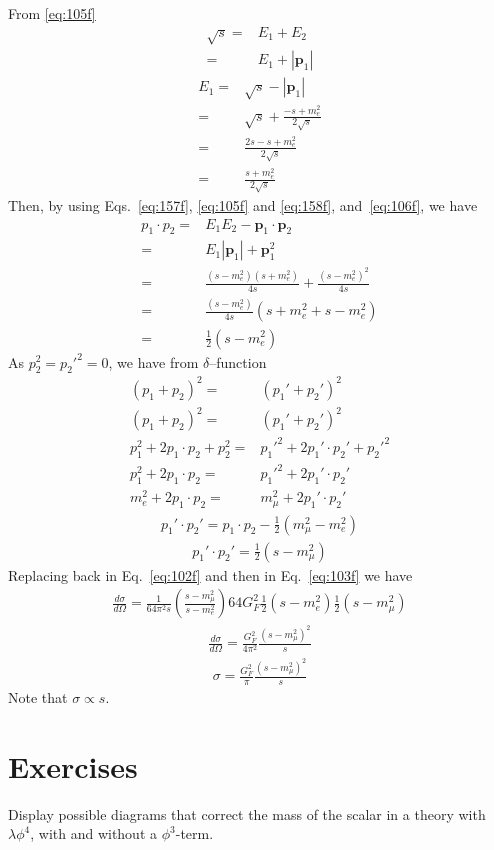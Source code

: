 From \eqref{eq:105f}
\begin{align}
  \sqrt{s}=&E_1+E_2\nonumber\\
  =&E_1+|\mathbf{p}_1|
\end{align}
\begin{align}
  \label{eq:106f}
  E_1=&\sqrt{s}-|\mathbf{p}_1|\nonumber\\
  =&\sqrt{s}+\frac{-s+m_e^2}{2\sqrt{s}}\nonumber\\
  =&\frac{2s-s+m_e^2}{2\sqrt{s}}\nonumber\\
  =&\frac{s+m_e^2}{2\sqrt{s}}
\end{align}
Then, by using Eqs.~\eqref{eq:157f}, \eqref{eq:105f} and \eqref{eq:158f}, and~\eqref{eq:106f},  we have
\begin{align}
  p_1\cdot p_2=&E_1E_2-\mathbf{p}_1\cdot\mathbf{p}_2\nonumber\\
  =&E_1|\mathbf{p}_1|+\mathbf{p}_1^2\nonumber\\
=&\frac{(s-m_e^2)(s+m_e^2)}{4s}+\frac{(s-m_e^2)^2}{4s}\nonumber\\
=&\frac{(s-m_e^2)}{4s}(s+m_e^2+s-m_e^2)\nonumber\\
=&\frac{1}{2}(s-m_e^2) 
\end{align}
As $p_2^2={p_2'}^2=0$, we have from $\delta$--function
\begin{align}
  (p_1+p_2)^2=&(p_1'+p_2')^2\nonumber\\
  (p_1+p_2)^2=&(p_1'+p_2')^2\nonumber\\
  p_1^2+2p_1\cdot p_2+p_2^2=&{p_1'}^2+2p_1'\cdot p_2'+{p_2'}^2\nonumber\\
  p_1^2+2p_1\cdot p_2=&{p_1'}^2+2p_1'\cdot p_2'\nonumber\\
  m_e^2+2p_1\cdot p_2=&m_\mu^2+2p_1'\cdot p_2'
\end{align}
\begin{align}
  p_1'\cdot p_2'=p_1\cdot p_2-\frac{1}{2}(m_\mu^2-m_e^2)
\end{align}
\begin{align}
  p_1'\cdot p_2'=\frac{1}{2}(s-m_\mu^2) 
\end{align}
Replacing back in Eq.~\eqref{eq:102f} and then in Eq.~\eqref{eq:103f} we have
\begin{align}
  \frac{d\sigma}{d\Omega}=\frac{1}{64\pi^2s}\left(\frac{s-m_\mu^2}{s-m_e^2}\right)
64G_F^2\frac{1}{2}(s-m_e^2)\frac{1}{2}(s-m_\mu^2)
\end{align} 
\begin{align}
    \frac{d\sigma}{d\Omega}=\frac{G_F^2}{4\pi^2}\frac{(s-m_\mu^2)^2}{s}
\end{align}
\begin{align}
\sigma  =\frac{G_F^2}{\pi}\frac{(s-m_\mu^2)^2}{s}
\end{align}
Note that $\sigma\propto s$.

\section{Exercises}
Display possible diagrams that correct the mass of the scalar in a theory with $\lambda \phi^4$, with and without a $\phi^3$-term.




